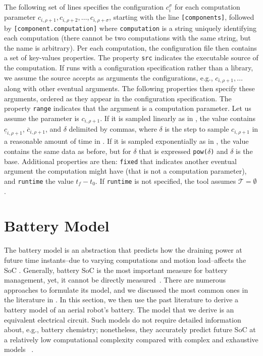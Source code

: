 The following set of lines specifies the configuration $c_i^\sigma$ for each computation parameter $c_{i,\rho+1},c_{i,\rho+2},\dots,c_{i,\rho+\sigma}$, starting with the line {\small\tt [components]}, followed by {\small\tt [component.computation]} where {\small\tt computation} is a string uniquely identifying each computation (there cannot be two computations with the same string, but the name is arbitrary). Per each computation, the configuration file then contains a set of key-values properties. The property {\small\tt src} indicates the executable source of the computation. If \powprof{} runs with a configuration specification rather than a library, we assume the source accepts as arguments the configurations, e.g., $c_{i,\rho+1},\dots$ along with other eventual arguments. The following properties then specify these arguments, ordered as they appear in the configuration specification. The property {\small\tt range} indicates that the argument is a computation parameter. Let us assume the parameter is $c_{i,\rho+1}$. If it is sampled linearly as in , the value contains $\underline{c}_{i,\rho+1}$, $\overline{c}_{i,\rho+1}$, and $\delta$ delimited by commas, where $\delta$ is the step to sample $c_{i,\rho+1}$ in a reasonable amount of time in . If it is sampled exponentially as in , the value contains the same data as before, but for $\delta$ that is expressed {\small\tt pow(}$\delta${\small\tt )} and $\delta$ is the base.
Additional properties are then: {\small\tt fixed} that indicates another eventual argument the computation might have (that is not a computation parameter), and {\small\tt runtime} the value $t_f-t_0$. If {\small\tt runtime} is not specified, the tool assumes $\mathcal{T}=\emptyset$.


\section{Battery Model}
\label{sec:battery-model}

The battery model is an abstraction that predicts how the draining power at future time instants--due to varying computations and motion load--affects the SoC%
. Generally, battery SoC is the most important measure for  battery management, yet, it cannot be directly measured~\citep{xia2015state}. There are numerous approaches to formulate its model, and we discussed the most common ones in the literature in 
. In this section, we then use the past literature to derive a battery model of an aerial robot's battery. The model that we derive is an equivalent electrical circuit. Such models do not require detailed information about, e.g., battery chemistry; nonetheless, they accurately predict future SoC at a relatively low computational complexity compared with complex and exhaustive models%
~\citep{rao2003battery}.

